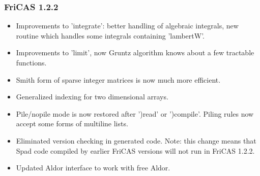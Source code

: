 
\subsubsection{FriCAS 1.2.2}
\begin{itemize}
\item Improvements to 'integrate': better handling of algebraic
  integrals, new routine which handles some integrals containing
  'lambertW'.

\item Improvements to 'limit', now Gruntz algorithm knows about
  a few tractable functions.

\item Smith form of sparse integer matrices is now much more
  efficient.

\item Generalized indexing for two dimensional arrays.

\item Pile/nopile mode is now restored after ')read' or ')compile'.
  Piling rules now accept some forms of multiline lists.

\item Eliminated version checking in generated code. Note: this
  change means that Spad code compiled by earlier FriCAS versions
  will not run in FriCAS 1.2.2.

\item Updated Aldor interface to work with free Aldor.
\end{itemize}

